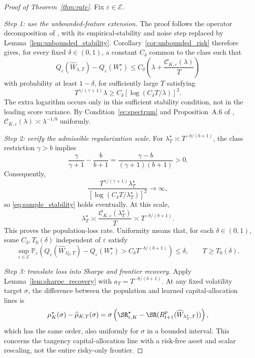 \begin{proof}[Proof of Theorem~\ref{thm:rate}]
Fix $\varepsilon\in\mathcal E$.

\medskip
\noindent\textit{Step 1: use the unbounded-feature extension.}
The proof follows the operator decomposition of
\citet{bignozzigagliardinischneider2026}, with its empirical-stability and
noise step replaced by Lemma~\ref{lem:unbounded_stability}.
Corollary~\ref{cor:unbounded_risk} therefore gives, for every fixed
$\delta\in(0,1)$, a constant $C_\delta$ common to the class such that
\[
Q_\varepsilon(\widehat W_{\lambda,T})-Q_\varepsilon(W^\star_\varepsilon)
\leq C_\delta\left(\lambda+\frac{\mathcal C_{K,\varepsilon}(\lambda)}{T}\right)
\]
with probability at least $1-\delta$, for sufficiently large $T$ satisfying
\begin{equation}
T^{\gamma/(\gamma+1)}\lambda
\geq C_\delta[\log(C_\delta T/\lambda)]^2.
\label{eq:sample_stability}
\end{equation}
The extra logarithm occurs only in this sufficient stability condition,
not in the leading score variance. By Condition~\ref{ec:spectrum} and
Proposition~A.6 of \citet{bignozzigagliardinischneider2026},
$\mathcal C_{K,\varepsilon}(\lambda)\asymp\lambda^{-1/b}$ uniformly.

\medskip
\noindent\textit{Step 2: verify the admissible regularization scale.}
For $\lambda_T^\star\asymp T^{-b/(b+1)}$, the class restriction
$\gamma>b$ implies
\[
\frac{\gamma}{\gamma+1}-\frac{b}{b+1}
=\frac{\gamma-b}{(\gamma+1)(b+1)}>0.
\]
Consequently,
\[
\frac{T^{\gamma/(\gamma+1)}\lambda_T^\star}
 {[\log(C_\delta T/\lambda_T^\star)]^2}\longrightarrow\infty,
\]
so \eqref{eq:sample_stability} holds eventually. At this scale,
\[
\lambda_T^\star
\asymp\frac{\mathcal C_{K,\varepsilon}(\lambda_T^\star)}{T}
\asymp T^{-b/(b+1)}.
\]
This proves the population-loss rate. Uniformity means that, for each
$\delta\in(0,1)$, some $C_\delta,T_0(\delta)$ independent of $\varepsilon$
satisfy
\[
\sup_{\varepsilon\in\mathcal E}
\mathbb P_\varepsilon\!\left(
 Q_\varepsilon(\widehat W_{\lambda_T^\star,T})
 -Q_\varepsilon(W^\star_\varepsilon)
 >C_\delta T^{-b/(b+1)}
\right)\leq\delta,
\qquad T\geq T_0(\delta).
\]

\medskip
\noindent\textit{Step 3: translate loss into Sharpe and frontier recovery.}
Apply Lemma~\ref{lem:sharpe_recovery} with $a_T=T^{-b/(b+1)}$. At any fixed volatility target $\sigma$, the difference
between the population and learned capital-allocation lines is
\[
\mu^\star_K(\sigma)-\widehat\mu_{K,T}(\sigma)
=\sigma\left(\SR^\star_{\varepsilon,K}
-\SR(R^p_{t+1}(\widehat W_{\lambda_T^\star,T}))\right),
\]
which has the same order, also uniformly for $\sigma$ in a bounded interval.
This concerns the tangency capital-allocation line with a risk-free asset
and scalar rescaling, not the entire risky-only frontier.
\end{proof}

